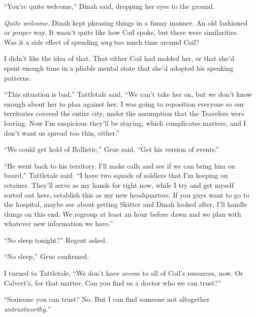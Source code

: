 ``You're quite welcome,'' Dinah said, dropping her eyes to the ground.



\emph{Quite welcome}.  Dinah kept phrasing things in a funny manner.  An old fashioned or \emph{proper} way.  It wasn't quite like how Coil spoke, but there were similarities.  Was it a side effect of spending \emph{way} too much time around Coil?



I didn't like the idea of that.  That either Coil had molded her, or that she'd spent enough time in a pliable mental state that she'd adopted his speaking patterns.



``This situation is bad,'' Tattletale said.  ``We can't take her on, but we don't know enough about her to plan against her.  I was going to reposition everyone so our territories covered the entire city, under the assumption that the Travelers were leaving.  Now I'm suspicious they'll be staying, which complicates matters, and I don't want us spread too thin, either.''



``We could get hold of Ballistic,'' Grue said.  ``Get his version of events.''



``He went back to his territory.  I'll make calls and see if we can bring him on board,'' Tattletale said.  ``I have two squads of soldiers that I'm keeping on retainer.  They'll serve as my hands for right now, while I try and get myself sorted out here, establish this as my new headquarters.  If you guys want to go to the hospital, maybe see about getting Skitter and Dinah looked after, I'll handle things on this end.  We regroup at least an hour before dawn and we plan with whatever new information we have.''



``No sleep tonight?'' Regent asked.



``No sleep,'' Grue confirmed.



I turned to Tattletale, ``We don't have access to all of Coil's resources, now.  Or Calvert's, for that matter.  Can you find us a doctor who we can trust?''



``Someone you can trust?  No.  But I can find someone not altogether \emph{un}\emph{trustworthy.}''



